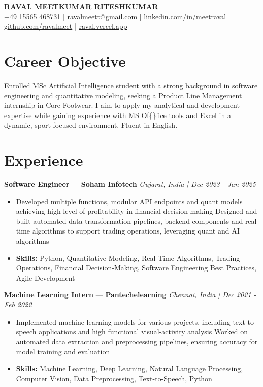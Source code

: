 \documentclass[a4paper,10pt]{article}
\begin{document}
\begin{center}
  {\Large\bfseries RAVAL MEETKUMAR RITESHKUMAR}\\[2pt]
  {\small +49 15565 468731 \;|\; \href{mailto:ravalmeett@gmail.com}{ravalmeett@gmail.com} \;|\; \href{https://www.linkedin.com/in/meetraval/}{linkedin.com/in/meetraval} \;|\; \href{https://github.com/ravalmeet}{github.com/ravalmeet} \;|\; \href{https://raval.vercel.app/}{raval.vercel.app}}
\end{center}
\vspace{-3pt}

\section*{Career Objective}
Enrolled MSc Artificial Intelligence student with a strong background in software engineering and quantitative modeling, seeking a Product Line Management internship in Core Footwear. I aim to apply my analytical and development expertise while gaining experience with MS Of\{\}fice tools and Excel in a dynamic, sport-focused environment. Fluent in English.\par

\section*{Experience}
\textbf{Software Engineer} — \textbf{Soham Infotech} \hfill \textit{Gujarat, India \;|\; Dec 2023 - Jan 2025}\par
\vspace{1pt}
\begin{itemize}
  \item Developed multiple functions, modular API endpoints and quant models achieving high level of profitability in financial decision-making Designed and built automated data transformation pipelines, backend components and real-time algorithms to support trading operations, leveraging quant and AI algorithms
  \item \textbf{Skills:} Python, Quantitative Modeling, Real-Time Algorithms, Trading Operations, Financial Decision-Making, Software Engineering Best Practices, Agile Development
\end{itemize}
\vspace{3pt}
\textbf{Machine Learning Intern} — \textbf{Pantechelearning} \hfill \textit{Chennai, India \;|\; Dec 2021 - Feb 2022}\par
\vspace{1pt}
\begin{itemize}
  \item Implemented machine learning models for various projects, including text-to-speech applications and high functional visual-activity analysis Worked on automated data extraction and preprocessing pipelines, ensuring accuracy for model training and evaluation
  \item \textbf{Skills:} Machine Learning, Deep Learning, Natural Language Processing, Computer Vision, Data Preprocessing, Text-to-Speech, Python
\end{itemize}
\end{document}
